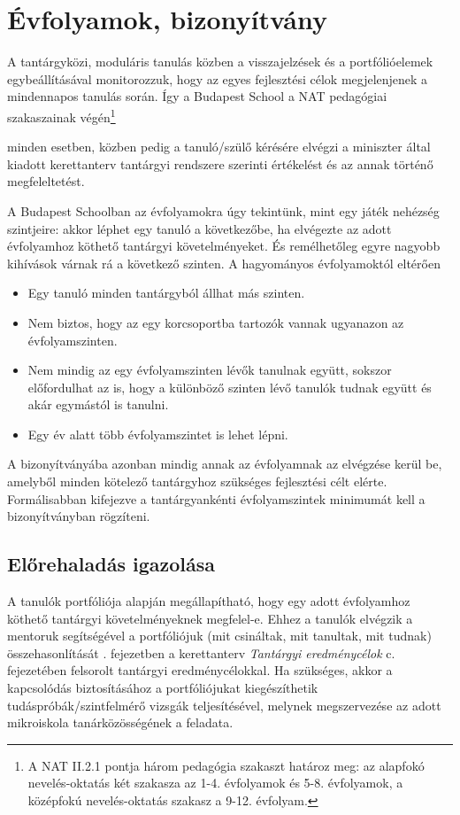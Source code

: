 \section{Évfolyamok, bizonyítvány}
\label{sec:evfolyamok}

A tantárgyközi, moduláris tanulás közben a visszajelzések és a portfólióelemek
egybeállításával monitorozzuk, hogy az egyes fejlesztési célok megjelenjenek a
mindennapos tanulás során. Így a Budapest School a NAT pedagógiai szakaszainak
végén\footnote{A NAT II.2.1 pontja három pedagógia szakaszt határoz meg: az
      alapfokó nevelés-oktatás két szakasza az 1-4. évfolyamok és 5-8. évfolyamok, 
      a középfokú nevelés-oktatás szakasz a 9-12. évfolyam.}

minden esetben, közben pedig a tanuló/szülő kérésére elvégzi a miniszter
által kiadott kerettanterv tantárgyi rendszere szerinti értékelést és az annak
történő megfeleltetést.

A Budapest Schoolban az évfolyamokra úgy tekintünk, mint egy játék nehézség
szintjeire: akkor léphet egy tanuló a következőbe, ha elvégezte az adott
évfolyamhoz köthető tantárgyi követelményeket. És remélhetőleg egyre nagyobb
kihívások várnak rá a következő szinten. A hagyományos évfolyamoktól eltérően

\begin{itemize}
      \item Egy tanuló minden tantárgyból állhat más szinten.
      \item Nem biztos, hogy az egy korcsoportba tartozók vannak ugyanazon az
            évfolyamszinten.
      \item Nem mindig az egy évfolyamszinten lévők tanulnak együtt, sokszor
            előfordulhat az is, hogy a különböző szinten lévő tanulók tudnak együtt
            és akár
            egymástól is tanulni.
      \item Egy év alatt több évfolyamszintet is lehet lépni.
\end{itemize}

A bizonyítványába azonban mindig annak az évfolyamnak az elvégzése kerül be,
amelyből minden kötelező tantárgyhoz szükséges fejlesztési célt elérte.
Formálisabban kifejezve a tantárgyankénti évfolyamszintek minimumát kell a
bizonyítványban rögzíteni.

\subsection{Előrehaladás igazolása}
A tanulók portfóliója alapján megállapítható, hogy egy adott évfolyamhoz
köthető tantárgyi követelményeknek megfelel-e. Ehhez a tanulók elvégzik a
mentoruk segítségével a portfóliójuk (mit csináltak, mit tanultak, mit tudnak)
összehasonlítását
\ifkerettanterv
      . fejezetben
\else
      a kerettanterv \emph{Tantárgyi eredménycélok} c. fejezetében
\fi
felsorolt tantárgyi
eredménycélokkal. Ha szükséges, akkor a kapcsolódás biztosításához a
portfóliójukat kiegészíthetik tudáspróbák/szintfelmérő vizsgák teljesítésével,
melynek megszervezése az adott mikroiskola tanárközösségének a feladata.

